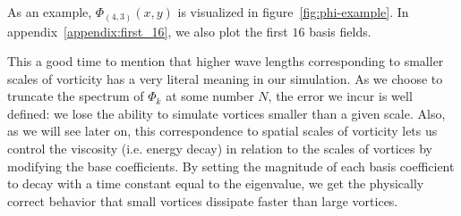 As an example, $\Phi_{(4,3)}(x,y)$ is visualized in figure~\ref{fig:phi-example}.
In appendix~\ref{appendix:first_16}, we also plot the first $16$ basis fields.

This a good time to mention that higher wave lengths corresponding to smaller
scales of vorticity has a very literal meaning in our simulation. As we choose
to truncate the spectrum of ${\Phi_k}$ at some number $N$, the error we incur is
well defined: we lose the ability to simulate vortices smaller than a given
scale. Also, as we will see later on, this correspondence to spatial scales of
vorticity lets us control the viscosity (i.e. energy decay) in relation to the
scales of vortices by modifying the base coefficients. By setting the magnitude
of each basis coefficient to decay with a time constant equal to the eigenvalue,
we get the physically correct behavior that small vortices dissipate faster than
large vortices.


